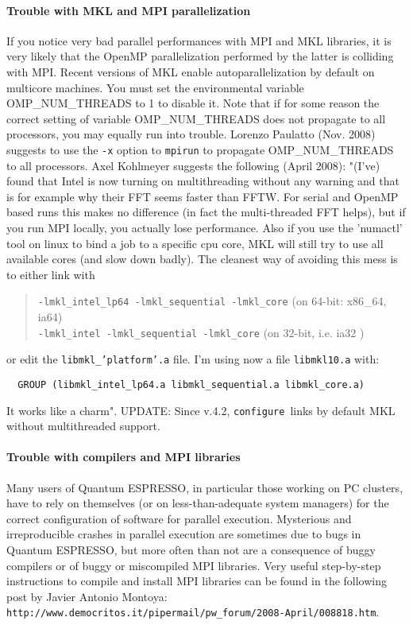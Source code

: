\documentclass[12pt,a4paper]{article}
\def\qe{{\sc Quantum ESPRESSO}}
\def\configure{\texttt{configure}}
\begin{document}
\paragraph{Trouble with MKL and MPI parallelization}
If you notice very bad parallel performances with MPI and MKL libraries, 
it is very likely that the OpenMP parallelization performed by the latter 
is colliding with MPI. Recent versions of MKL enable autoparallelization
by default on multicore machines.  You must set the environmental variable
OMP\_NUM\_THREADS to 1 to disable it. 
Note that if for some reason the correct setting  of variable
OMP\_NUM\_THREADS  
does not propagate to all processors, you may equally run into trouble. 
Lorenzo Paulatto (Nov. 2008) suggests to use the \texttt{-x} option to \texttt{mpirun} to 
propagate OMP\_NUM\_THREADS to all processors.
Axel Kohlmeyer suggests the following (April 2008): 
"(I've) found that Intel is now turning on multithreading without any
warning and that is for example why their FFT seems faster than
FFTW. For serial and OpenMP based runs this makes no difference (in
fact the multi-threaded FFT helps), but if you run MPI locally, you
actually lose performance. Also if you use the 'numactl' tool on linux
to bind a job to a specific cpu core, MKL will still try to use all
available cores (and slow down badly). The cleanest way of avoiding
this mess is to either link with
\begin{quote}
\texttt{-lmkl\_intel\_lp64 -lmkl\_sequential -lmkl\_core} (on 64-bit: 
x86\_64, ia64)\\
\texttt{-lmkl\_intel -lmkl\_sequential -lmkl\_core} (on 32-bit, i.e. ia32 )
\end{quote}
or edit the \texttt{libmkl\_'platform'.a} file. I'm using now a file 
\texttt{libmkl10.a} with:
\begin{verbatim}
  GROUP (libmkl_intel_lp64.a libmkl_sequential.a libmkl_core.a)
\end{verbatim}
It works like a charm". UPDATE: Since v.4.2, \configure\ links by
default MKL without multithreaded support.

\paragraph{Trouble with compilers and MPI libraries}
Many users of \qe, in particular those working on PC clusters,
have to rely on themselves (or on less-than-adequate system managers) for 
the correct configuration of software for parallel execution. Mysterious and
irreproducible crashes in parallel execution are sometimes due to bugs
in \qe, but more often than not are a consequence of buggy
compilers or of buggy or miscompiled MPI libraries. Very useful step-by-step 
instructions to compile and install MPI libraries
can be found in the following post by Javier Antonio Montoya:\\
\texttt{http://www.democritos.it/pipermail/pw\_forum/2008-April/008818.htm}.
\end{document}
